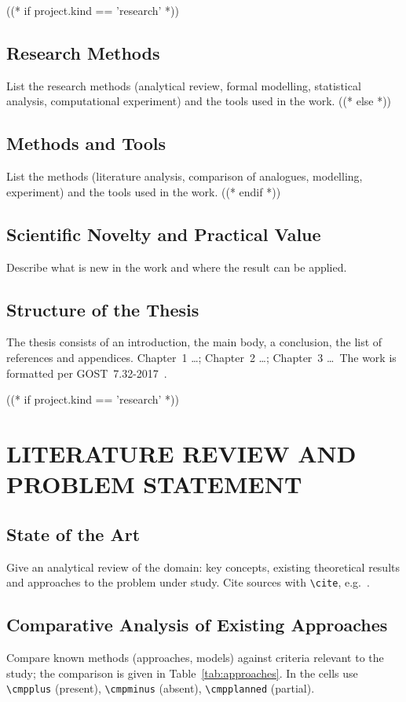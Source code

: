 \documentclass[12pt,a4paper]{extreport}
\begin{document}
((* if project.kind == 'research' *))
\section*{Research Methods}
List the research methods (analytical review, formal modelling, statistical
analysis, computational experiment) and the tools used in the work.
((* else *))
\section*{Methods and Tools}
List the methods (literature analysis, comparison of analogues, modelling,
experiment) and the tools used in the work.
((* endif *))

\section*{Scientific Novelty and Practical Value}
Describe what is new in the work and where the result can be applied.

\section*{Structure of the Thesis}
The thesis consists of an introduction, the main body, a conclusion, the list
of references and appendices. Chapter~1 \ldots; Chapter~2 \ldots; Chapter~3
\ldots\ The work is formatted per GOST~7.32-2017~\cite{gost732}.

\clearpage

((* if project.kind == 'research' *))
\chapter{LITERATURE REVIEW AND PROBLEM STATEMENT}
\section{State of the Art}
Give an analytical review of the domain: key concepts, existing theoretical
results and approaches to the problem under study. Cite sources with
\verb|\cite|, e.g.~\cite{article}.

\section{Comparative Analysis of Existing Approaches}
Compare known methods (approaches, models) against criteria relevant to the
study; the comparison is given in Table~\ref{tab:approaches}. In the cells use
\verb|\cmpplus| (present), \verb|\cmpminus| (absent), \verb|\cmpplanned| (partial).
\end{document}
